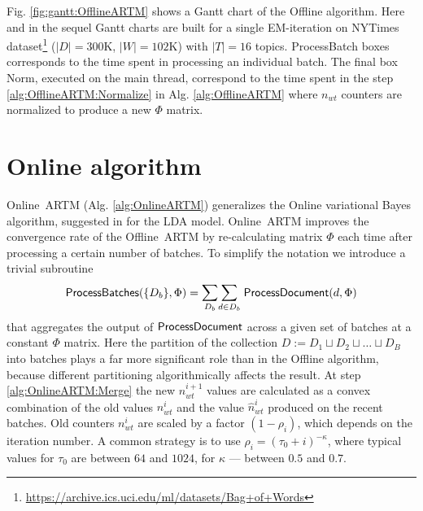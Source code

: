\documentclass[russian,english]{llncs}
\newcommand{\kw}[1]{\mbox{\textsf{#1}}}
\begin{document}
Fig. \ref{fig:gantt:OfflineARTM} shows a Gantt chart of the \kw{Offline} algorithm.
Here and in the sequel Gantt charts are built for a single EM-iteration on
\kw{NYTimes} dataset\footnote{\url{https://archive.ics.uci.edu/ml/datasets/Bag+of+Words}}
($|D|=300$K, $|W|=102$K) with $|T|=16$ topics.
\kw{ProcessBatch} boxes corresponds to the time spent in processing an individual batch.
The final box \kw{Norm}, executed on the main thread,
correspond to the time spent in the step \ref{alg:OfflineARTM:Normalize} in Alg. \ref{alg:OfflineARTM}
where $n_{wt}$ counters are normalized to produce a new $\Phi$ matrix.


\section{Online algorithm}
\label{sec:OnlineARTM}

\kw{Online ARTM} (Alg. \ref{alg:OnlineARTM}) generalizes
the Online variational Bayes algorithm,
suggested in \cite{hoffman10online} for the LDA model.
\kw{Online ARTM} improves the convergence rate of the \kw{Offline ARTM}
by re-calculating matrix $\Phi$ each time after processing a certain number of batches.
To simplify the notation
we introduce a trivial subroutine
\[
\kw{ProcessBatches}(\{D_b\}, \Phi) = \mathlarger\sum\limits_{D_b} \mathlarger\sum\limits_{d \in D_b} \; \kw{ProcessDocument}(d, \Phi) \\
\]
that aggregates the output of $\kw{ProcessDocument}$ across a given set of batches at a constant $\Phi$ matrix.
Here the partition of the collection $D := D_1 \sqcup D_2 \sqcup \dots \sqcup D_B$
into batches
plays a far more significant role than in the \kw{Offline} algorithm,
because different partitioning algorithmically affects the result.
At step \ref{alg:OnlineARTM:Merge} the new $n_{wt}^{i+1}$ values are calculated as a convex combination
of the old values $n_{wt}^{i}$ and the value $\hat n_{wt}^{i}$ produced on the recent batches.
Old counters $n_{wt}^{i}$ are scaled by a factor $(1 - \rho_i)$,
which depends on the iteration number. A common strategy is to use $\rho_i = (\tau_0 + i)^{-\kappa}$,
where typical values for $\tau_0$ are between $64$ and $1024$, for $\kappa$ --- between $0.5$ and $0.7$.
\end{document}

